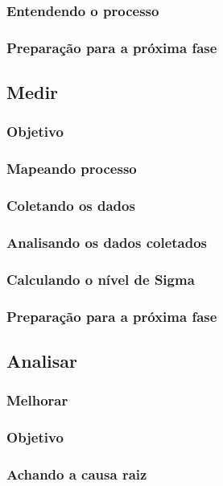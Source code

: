 \documentclass{abnt}
\begin{document}
					\subsubsection {Entendendo o processo}
					\subsubsection {Preparação para a próxima fase}
				\subsection {Medir}
					\subsubsection {Objetivo}
					\subsubsection {Mapeando processo}
					\subsubsection {Coletando os dados}
					\subsubsection {Analisando os dados coletados}
					\subsubsection {Calculando o nível de Sigma}
					\subsubsection {Preparação para a próxima fase}
				\subsection {Analisar}
					\subsubsection {Melhorar}
					\subsubsection {Objetivo}
					\subsubsection {Achando a causa raiz}
\end{document}
